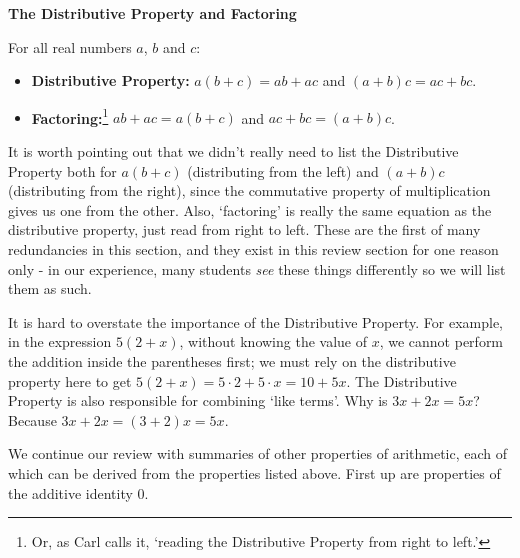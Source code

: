 \medskip

\label{distributiveproperty}

\colorbox{ResultColor}{\bbm

\centerline{\textbf{The Distributive Property and Factoring}}
For all real numbers $a$, $b$ and $c$:

\begin{itemize}

\item  \textbf{Distributive Property:}   $a(b+c) = ab + ac$ and $(a+b)c = ac + bc$.

\item  \textbf{Factoring:}\footnote{Or, as Carl calls it, `reading the Distributive Property from right to left.'}   $ab+ac = a(b+c)$ and $ac + bc = (a+b)c$.

\end{itemize}

\ebm}

\medskip

It is worth pointing out that we didn't really need to list the Distributive Property both for $a(b+c)$ (distributing from the left) and $(a+b)c$ (distributing from the right), since the commutative property of multiplication gives us one from the other.  Also, `factoring' is really the same equation as the distributive property, just read from right to left. These are the first of many redundancies in this section, and they exist in this review section for one reason only - in our experience, many students \textit{see} these things differently so we will list them as such.   

\medskip

It is hard to overstate the importance of the Distributive Property.  For example, in the expression $5(2+x)$, without knowing the value of $x$, we cannot perform the addition inside the parentheses first;  we must rely on the distributive property here to get  $5(2+x) = 5\cdot 2 + 5 \cdot x = 10 + 5x$.  The Distributive Property is also responsible for combining `like terms'.  Why is $3x + 2x = 5x$?  Because  $3x + 2x = (3+2)x = 5x$.  

\medskip

We continue our review with summaries of other properties of arithmetic, each of which can be derived from the properties listed above.  First up are properties of the additive identity $0$.

\medskip

\label{propertiesofzero}

